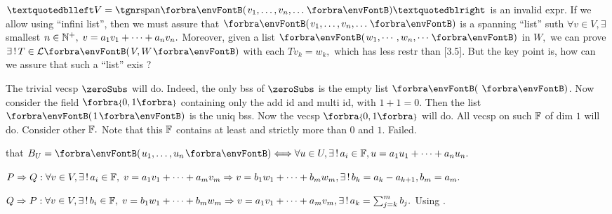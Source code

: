 \vfill{}

\vspace{4pt}

\BulletPointX{}\;\;$“V=\Span{v_1,\dots,v_n,\dots}”$ is an invalid expr.\TextB{}
If we allow using $“$infini list$”$, then we must assure that $\Par{v_1,\dots,v_n,\dots}$ is a spanning $“$list$”$\TextB{}
suth $\forall v\in V,\exists$ smallest $n\in{\mathbb{N}^+},\;v=a_1 v_1+\dots+a_n v_n.$ Moreover, given a list $\Par{w_1,\cdots,w_n,\cdots}$ in $W,$\TextB{}
we can prove $\exists\,!\,T\in\Lm{V,W}$ with each $Tv_k=w_k,$ which has less restr than [3.5].\TextB{}
But the key point is, how can we assure that such a $“$list$”$ exis ? 
\SepLine

The trivial vecsp $\zeroSubs$ will do. Indeed, the only bss of $\zeroSubs$ is the empty list $\Par{\,}$.\parSol{}
Now consider the field $\Bra{0,1}$ containing only the add id and multi id,\parSol{}
with $1+1=0.$ Then the list $\Par{1}$ is the uniq bss. Now the vecsp $\Bra{0,1}$ will do.\parSol{}
\AComm All vecsp on such ${\mathbb{F}}$ of dim $1$ will do.\parSol{}
Consider other ${\mathbb{F}}.$ Note that this ${\mathbb{F}}$ contains at least and strictly more than $0$ and $1.$ Failed.\PfEnd
\SepLine\pagebreak


\NOTICE that $B_U=\Par{u_1,\dots,u_n}\Longleftrightarrow\forall u\in U,\exists\,!\,a_i\in\Fbb,u=a_1 u_1+\dots+a_n u_n.$\par\quad
$P\Rightarrow Q:\forall v\in V,\exists\,!\,a_i\in{\mathbb{F}},\;v=a_1 v_1+\dots+a_m v_m\Rightarrow v=b_1 w_1+\dots+b_m w_m,\exists\,!\,b_k=a_k-a_{k+1},b_m=a_m.$\vspace{2pt}\par\quad
$Q\Rightarrow P:\forall v\in V,\exists\,!\,b_i\in{\mathbb{F}},\;v=b_1w_1+\dots+b_mw_m\Rightarrow v=a_1v_1+\dots+a_mv_m,\exists\,!\,a_k=\sum_{j=k}^m b_j.$\PfEnd\vspace{3pt}
\AComm \Or Using .
\SepLine

